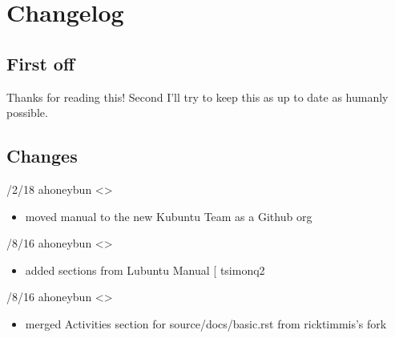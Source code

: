 \documentclass[letterpaper,10pt,english]{sphinxmanual}
\begin{document}
\section{Changelog}
\label{\detokenize{docs/appendix/changes:changelog}}\label{\detokenize{docs/appendix/changes::doc}}

\subsection{First off}
\label{\detokenize{docs/appendix/changes:first-off}}
\sphinxAtStartPar
Thanks for reading this! Second I’ll try to keep this as up to date as humanly possible.


\subsection{Changes}
\label{\detokenize{docs/appendix/changes:changes}}
/2/18 \sphinxhyphen{} ahoneybun \textless{}\textgreater{}
\begin{itemize}
\item {} 
\sphinxAtStartPar
moved manual to the new Kubuntu Team as a Github org

\end{itemize}

/8/16 \sphinxhyphen{} ahoneybun \textless{}\textgreater{}
\begin{itemize}
\item {} 
\sphinxAtStartPar
added sections from Lubuntu Manual {[}\sphinxurl{https://github.com/tsimonq2/lubuntu-manual}{]}
\sphinxhyphen{} tsimonq2

\end{itemize}

/8/16 \sphinxhyphen{} ahoneybun \textless{}\textgreater{}
\begin{itemize}
\item {} 
\sphinxAtStartPar
merged Activities section for source/docs/basic.rst from ricktimmis’s fork

\end{itemize}
\end{document}
